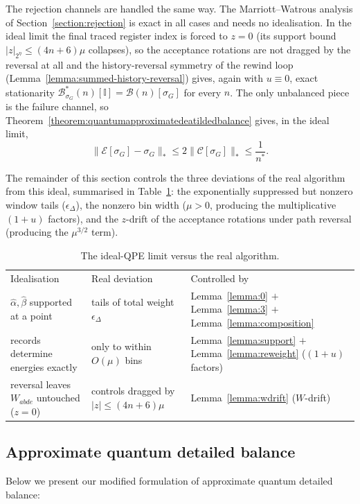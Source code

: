 \documentclass[aps,floatfix,10pt,amssymb,amsfont,amsmath,superscriptaddress,float,nofootinbib,longbibliography,nobalancelastpage,twocolumn]{revtex4-2}
\begin{document}
The rejection channels are handled the same way. The Marriott--Watrous analysis of Section~\ref{section:rejection} is exact in all cases and needs no idealisation. In the ideal limit the final traced register index is forced to $z = 0$ (its support bound $|z|_{2^{\eta}} \leq (4n+6)\mu$ collapses), so the acceptance rotations are not dragged by the reversal at all and the history-reversal symmetry of the rewind loop (Lemma~\ref{lemma:summed-history-reversal}) gives, again with $u \equiv 0$, exact stationarity $\mathcal{B}^*_{\sigma_G}(n)[\mathbb{I}] = \mathcal{B}(n)[\sigma_G]$ for every $n$. The only unbalanced piece is the failure channel, so Theorem~\ref{theorem:quantumapproximatedeatildedbalance} gives, in the ideal limit,
\begin{equation}
    \|\mathcal{E}[\sigma_G] - \sigma_G\|_* \leq 2\|\mathcal{C}[\sigma_G]\|_* \leq \frac{1}{n^*}.
\end{equation}

The remainder of this section controls the three deviations of the real algorithm from this ideal, summarised in Table~\ref{tab:whatbreaks}: the exponentially suppressed but nonzero window tails ($\epsilon_{\Delta}$), the nonzero bin width ($\mu > 0$, producing the multiplicative $(1+u)$ factors), and the $z$-drift of the acceptance rotations under path reversal (producing the $\mu^{3/2}$ term).
\begin{table}
\caption{The ideal-QPE limit versus the real algorithm.}
\label{tab:whatbreaks}
\begin{ruledtabular}
\begin{tabular}{lll}
Idealisation & Real deviation & Controlled by \\
\colrule
$\hat\alpha, \hat\beta$ supported at a point & tails of total weight $\epsilon_{\Delta}$ & Lemma~\ref{lemma:0} $+$ Lemma~\ref{lemma:3} $+$ Lemma~\ref{lemma:composition} \\
records determine energies exactly & only to within $O(\mu)$ bins & Lemma~\ref{lemma:support} $+$ Lemma~\ref{lemma:reweight} ($(1+u)$ factors) \\
reversal leaves $W_{abde}$ untouched ($z=0$) & controls dragged by $|z| \leq (4n+6)\mu$ & Lemma~\ref{lemma:wdrift} ($W$-drift) \\
\end{tabular}
\end{ruledtabular}
\end{table}
\subsection{Approximate quantum detailed balance}
\label{subsec:aqdb}
Below we present our modified formulation of approximate quantum detailed balance:
\end{document}
